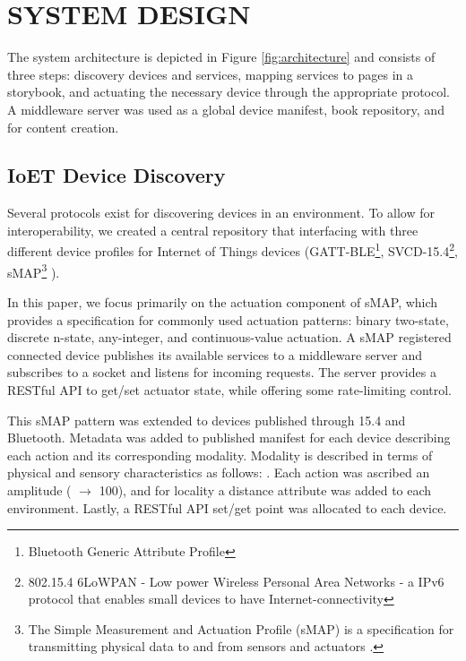 \documentclass{sigchi}
\newcommand*{\quoted}[1]{{\small{\fontfamily{cmss}\selectfont{#1}}}}
\begin{document}


\section{SYSTEM DESIGN}
The system architecture is depicted in Figure \ref{fig:architecture} and consists of three steps: discovery devices and services, mapping services to pages in a storybook, and actuating the necessary device through the appropriate protocol. 
A middleware server was used as a global device manifest, book repository, and for content creation. 



\subsection{IoET Device Discovery} 
Several protocols exist for discovering devices in an environment. To allow for interoperability, we created a central repository that interfacing with three different device profiles for Internet of Things devices (GATT-BLE\footnote{Bluetooth Generic Attribute Profile}, SVCD-15.4\footnote{802.15.4 6LoWPAN - Low power Wireless Personal Area Networks - a IPv6 protocol that enables small devices to have Internet-connectivity}, sMAP\footnote{The Simple Measurement and Actuation Profile (sMAP) is a specification for transmitting physical data to and from sensors and actuators \cite{dawson-haggerty_smap:_2010}.} ).

In this paper, we focus primarily on the actuation component of sMAP, which provides a specification for commonly used actuation patterns: binary two-state, discrete n-state, any-integer, and continuous-value actuation. A sMAP registered connected device publishes its available services to a middleware server and subscribes to a socket and listens for incoming requests. The server provides a RESTful API to get/set actuator state, while offering some rate-limiting control. 

This sMAP pattern was extended to devices published through 15.4 and Bluetooth. 
Metadata was added to published manifest for each device describing each action and its corresponding modality. 
Modality is described in terms of physical and sensory characteristics as follows: \quoted{$\langle$ light, air, sound, smell, heat, taste, motion $\rangle$}.
Each action was ascribed an amplitude (\quoted{on} $\rightarrow$ 100), and for locality a distance attribute was added to each environment. Lastly, a RESTful API set/get point was allocated to each device.
\end{document}
